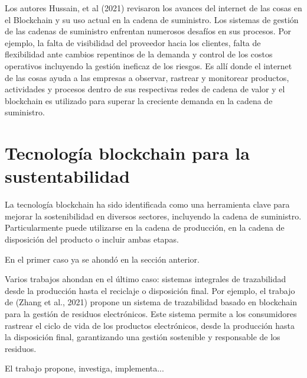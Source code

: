 \documentclass[main.tex]{subfiles}
\begin{document}
Los autores Hussain, et al (2021) revisaron los avances del internet de las cosas en el
Blockchain y su uso actual en la cadena de suministro. Los sistemas de gestión de las cadenas de
suministro enfrentan numerosos desafíos en sus procesos. Por ejemplo, la falta de visibilidad del
proveedor hacia los clientes, falta de flexibilidad ante cambios repentinos de la demanda y control
de los costos operativos incluyendo la gestión ineficaz de los riesgos. Es allí donde el internet de
las cosas ayuda a las empresas a observar, rastrear y monitorear productos, actividades y procesos
dentro de sus respectivas redes de cadena de valor y el blockchain es utilizado para superar la
creciente demanda en la cadena de suministro.

\section{Tecnología blockchain para la sustentabilidad}

La tecnología blockchain ha sido identificada como una herramienta clave para mejorar la sostenibilidad en diversos sectores, incluyendo la cadena de suministro. Particularmente puede utilizarse en la cadena de producción, en la cadena de disposición del producto o incluir ambas etapas.

En el primer caso ya se ahondó en la sección anterior.

Varios trabajos ahondan en el último caso: sistemas integrales de trazabilidad desde la producción hasta el reciclaje o disposición final. Por ejemplo, el trabajo de (Zhang et al., 2021) propone un sistema de trazabilidad basado en blockchain para la gestión de residuos electrónicos. Este sistema permite a los consumidores rastrear el ciclo de vida de los productos electrónicos, desde la producción hasta la disposición final, garantizando una gestión sostenible y responsable de los residuos.

El trabajo \cite{baralla2023waste, bulkowska2023implementation, alnuaimi2023blockchain, castiglione2023framework, alnuaimi2023blockchain, BISWAS2023128} propone, investiga, implementa...
\end{document}
